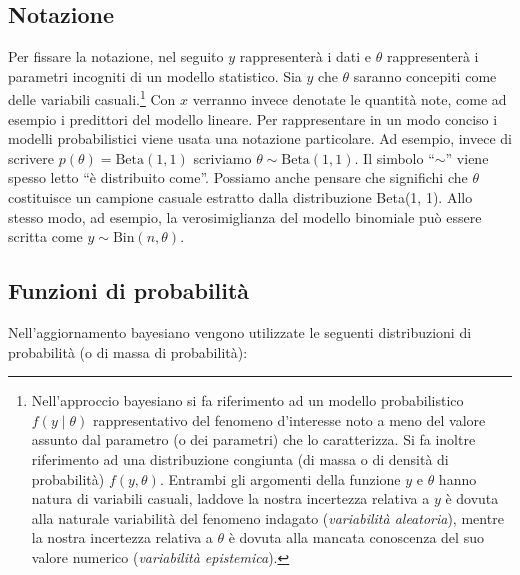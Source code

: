 \documentclass[
  10pt,
  italian,
  a4paper,
  extrafontsizes,onecolumn,openright
  ]{memoir}
\theoremstyle{definition}
\theoremstyle{definition}
\theoremstyle{definition}
\theoremstyle{definition}
\theoremstyle{remark}
\begin{document}
\hypertarget{notazione}{%
\subsection{Notazione}\label{notazione}}

Per fissare la notazione, nel seguito \(y\) rappresenterà i dati e \(\theta\) rappresenterà i parametri incogniti di un modello statistico. Sia \(y\) che \(\theta\) saranno concepiti come delle variabili casuali.\footnote{Nell'approccio bayesiano si fa riferimento ad un modello probabilistico \(f(y \mid \theta)\) rappresentativo del fenomeno d'interesse noto a meno del valore assunto dal parametro (o dei parametri) che lo caratterizza. Si fa inoltre riferimento ad una distribuzione congiunta (di massa o di densità di probabilità) \(f(y, \theta)\). Entrambi gli argomenti della funzione \(y\) e \(\theta\) hanno natura di variabili casuali, laddove la nostra incertezza relativa a \(y\) è dovuta alla naturale variabilità del fenomeno indagato (\emph{variabilità aleatoria}), mentre la nostra incertezza relativa a \(\theta\) è dovuta alla mancata conoscenza del suo valore numerico (\emph{variabilità epistemica}).} Con \(x\) verranno invece denotate le quantità note, come ad esempio i predittori del modello lineare. Per rappresentare in un modo conciso i modelli probabilistici viene usata una notazione particolare. Ad esempio, invece di scrivere \(p(\theta) = \text{Beta}(1, 1)\)
scriviamo \(\theta \sim \text{Beta}(1, 1)\). Il simbolo ``\(\sim\)'' viene spesso letto ``è distribuito come''. Possiamo anche pensare che significhi che \(\theta\) costituisce un campione casuale estratto dalla distribuzione Beta(1, 1). Allo stesso modo, ad esempio, la verosimiglianza del modello binomiale può essere scritta come \(y \sim \text{Bin}(n, \theta)\).

\hypertarget{funzioni-di-probabilituxe0}{%
\subsection{Funzioni di probabilità}\label{funzioni-di-probabilituxe0}}

Nell'aggiornamento bayesiano vengono utilizzate le seguenti distribuzioni di probabilità (o di massa di probabilità):
\end{document}
